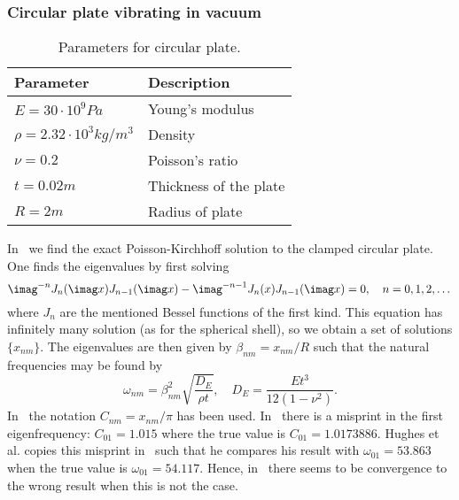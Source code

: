 \subsubsection{Circular plate vibrating in vacuum}
\begin{table}
	\centering
	\caption[Parameters for circular plate]{Parameters for circular plate.}
	\label{Tab2:circularPlateParameters}
	\begin{tabular}{l l}
		\toprule
		Parameter & Description\\
		\midrule
		$E = 30\cdot 10^9\unit{Pa}$ & Young's modulus\\
		$\rho = 2.32\cdot 10^3\unit{kg/m^3}$ & Density\\
		$\nu = 0.2$ & Poisson's ratio\\
		$t = 0.02\unit{m}$ & Thickness of the plate\\
		$R = 2\unit{m}$ & Radius of plate\\
		\bottomrule
	\end{tabular}
\end{table}
In~\cite[pp. 185-189]{Meirovitch1967ami} we find the exact Poisson-Kirchhoff solution to the clamped circular plate. One finds the eigenvalues by first solving
\begin{equation*}
	\imag^{-n}J_n(\imag x) J_{n-1}(\imag x) - \imag^{-n-1}J_n(x) J_{n-1}(\imag x) = 0,\quad n = 0,1,2,\dots
\end{equation*}
where $J_n$ are the mentioned Bessel functions of the first kind. This equation has infinitely many solution (as for the spherical shell), so we obtain a set of solutions $\{x_{nm}\}$. The eigenvalues are then given by $\beta_{nm} = x_{nm}/R$ such that the natural frequencies may be found by
\begin{equation}
	\omega_{nm} = \beta_{nm}^2\sqrt{\frac{D_E}{\rho t}},\quad D_E = \frac{E t^3}{12(1-\nu^2)}.
\end{equation}
In~\cite{Hughes2005iac} the notation $C_{nm} = x_{nm}/\pi$ has been used. In~\cite[p. 188]{Meirovitch1967ami} there is a misprint in the first eigenfrequency: $C_{01} = 1.015$ where the true value is $C_{01} = 1.0173886$. Hughes et al. copies this misprint in~\cite{Hughes2005iac} such that he compares his result with $\omega_{01} = 53.863$ when the true value is $\omega_{01} = 54.117$. Hence, in~\cite{Hughes2005iac} there seems to be convergence to the wrong result when this is not the case.
